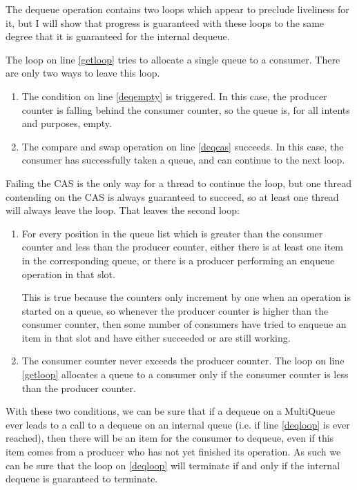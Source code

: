 \documentclass[12pt]{report}
\begin{document}
The dequeue operation contains two loops which appear to preclude liveliness
for it, but I will show that progress is guaranteed with these loops to the
same degree that it is guaranteed for the internal dequeue.

The loop on line \ref{getloop} tries to allocate a single queue to a consumer.
There are only two ways to leave this loop.

\begin{enumerate}
\item The condition on line \ref{deqempty} is triggered. In this case, the
producer counter is falling behind the consumer counter, so the queue is, for
all intents and purposes, empty.

\item The compare and swap operation on line \ref{deqcas} succeeds. In this
case, the consumer has successfully taken a queue, and can continue to the next
loop.
\end{enumerate}

Failing the CAS is the only way for a thread to continue the loop, but one
thread contending on the CAS is always guaranteed to succeed, so at least one
thread will always leave the loop. That leaves the second loop:

\begin{enumerate}
\item For every position in the queue list which is greater than the consumer
counter and less than the producer counter, either there is at least one item
in the corresponding queue, or there is a producer performing an enqueue
operation in that slot.

This is true because the counters only increment by one when an operation is
started on a queue, so whenever the producer counter is higher than the
consumer counter, then some number of consumers have tried to enqueue an item
in that slot and have either succeeded or are still working.

\item The consumer counter never exceeds the producer counter. The loop on
line \ref{getloop} allocates a queue to a consumer only if the consumer counter
is less than the producer counter.
\end{enumerate}

With these two conditions, we can be sure that if a dequeue on a MultiQueue
ever leads to a call to a dequeue on an internal queue (i.e. if line
\ref{deqloop} is ever reached), then there will be an item for the consumer to
dequeue, even if this item comes from a producer who has not yet finished its
operation. As such we can be sure that the loop on \ref{deqloop} will terminate
if and only if the internal dequeue is guaranteed to terminate.
\end{document}
